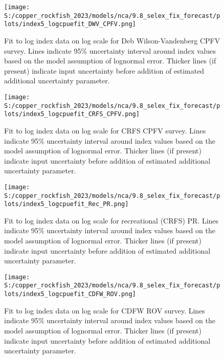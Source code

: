 \documentclass[11pt,
  english,
  letterpaper,
]{article}
\begin{document}
\pagebreak

\pagebreak

\begin{figure}
\centering
\texttt{[image: S:/copper\_rockfish\_2023/models/nca/9.8\_selex\_fix\_forecast/plots/index5\_logcpuefit\_DWV\_CPFV.png]}
\caption{Fit to log index data on log scale for Deb Wilson-Vandenberg CPFV survey. Lines indicate 95\% uncertainty interval around index values based on the model assumption of lognormal error. Thicker lines (if present) indicate input uncertainty before addition of estimated additional uncertainty parameter.\label{fig:dwv-cpfv-index-fit}}
\end{figure}

\pagebreak

\begin{figure}
\centering
\texttt{[image: S:/copper\_rockfish\_2023/models/nca/9.8\_selex\_fix\_forecast/plots/index5\_logcpuefit\_CRFS\_CPFV.png]}
\caption{Fit to log index data on log scale for CRFS CPFV survey. Lines indicate 95\% uncertainty interval around index values based on the model assumption of lognormal error. Thicker lines (if present) indicate input uncertainty before addition of estimated additional uncertainty parameter.\label{fig:crfs-cpfv-index-fit}}
\end{figure}

\pagebreak

\begin{figure}
\centering
\texttt{[image: S:/copper\_rockfish\_2023/models/nca/9.8\_selex\_fix\_forecast/plots/index5\_logcpuefit\_Rec\_PR.png]}
\caption{Fit to log index data on log scale for recreational (CRFS) PR. Lines indicate 95\% uncertainty interval around index values based on the model assumption of lognormal error. Thicker lines (if present) indicate input uncertainty before addition of estimated additional uncertainty parameter.\label{fig:crfs-pr-index-fit}}
\end{figure}

\FloatBarrier

\begin{figure}
\centering
\texttt{[image: S:/copper\_rockfish\_2023/models/nca/9.8\_selex\_fix\_forecast/plots/index5\_logcpuefit\_CDFW\_ROV.png]}
\caption{Fit to log index data on log scale for CDFW ROV survey. Lines indicate 95\% uncertainty interval around index values based on the model assumption of lognormal error. Thicker lines (if present) indicate input uncertainty before addition of estimated additional uncertainty parameter.\label{fig:rov-index-fit}}
\end{figure}
\end{document}

